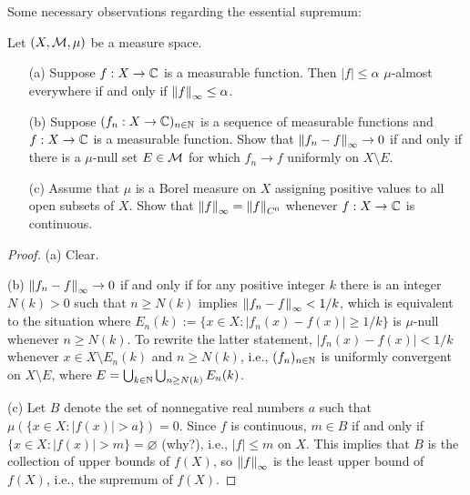 Some necessary observations regarding the essential supremum:
\begin{obs}
    Let $(X, {\mathcal{M}}, \mu)$ be a measure space.
    \begin{enumerate}
        \item[(a)]
        {
            Suppose $f: X\rightarrow{\mathbb{C}}$ is a measurable function.
            Then $|f|\leq\alpha$ $\mu$-almost everywhere if and only if ${\left\lVert{f}\right\rVert}_\infty\leq\alpha$.            
        }
        \item[(b)]
        {
            Suppose $(f_n: X\rightarrow{\mathbb{C}})_{n\in{\mathbb{N}}}$ is a sequence of measurable functions and $f: X\rightarrow{\mathbb{C}}$ is a measurable function.
            Show that ${\left\lVert{f_n-f}\right\rVert}_\infty\rightarrow 0$ if and only if there is a $\mu$-null set $E\in{\mathcal{M}}$ for which $f_n\rightarrow f$ uniformly on $X\setminus E$.
        }
        \item[(c)]
        {
            Assume that $\mu$ is a Borel measure on $X$ assigning positive values to all open subsets of $X$.
            Show that ${\left\lVert{f}\right\rVert}_\infty={\left\lVert{f}\right\rVert}_{C^0}$ whenever $f: X\rightarrow{\mathbb{C}}$ is continuous.
        }
    \end{enumerate}
\end{obs}
\begin{proof}
    \hangindent=0.65cm
    \noindent(a)
    Clear.

    \noindent(b)
    ${\left\lVert{f_n-f}\right\rVert}_\infty\rightarrow 0$ if and only if for any positive integer $k$ there is an integer $N(k)>0$ such that $n\geq N(k)$ implies ${\left\lVert{f_n-f}\right\rVert}_\infty<1/k$, which is equivalent to the situation where $E_n(k):=\{x\in X: |f_n(x)-f(x)|\geq 1/k\}$ is $\mu$-null whenever $n\geq N(k)$.
    To rewrite the latter statement, $|f_n(x)-f(x)|<1/k$ whenever $x\in X\setminus E_n(k)$ and $n\geq N(k)$, i.e., $(f_n)_{n\in{\mathbb{N}}}$ is uniformly convergent on $X\setminus E$, where $E=\bigcup_{k\in{\mathbb{N}}}\bigcup_{n\geq N(k)} E_n(k)$.

    \noindent(c)
    Let $B$ denote the set of nonnegative real numbers $a$ such that $\mu(\{x\in X: |f(x)|>a\})=0$.
    Since $f$ is continuous, $m\in B$ if and only if $\{x\in X: |f(x)|>m\}=\varnothing$ \color{brown}(why?)\color{black}, i.e., $|f|\leq m$ on $X$.
    This implies that $B$ is the collection of upper bounds of $f(X)$, so ${\left\lVert{f}\right\rVert}_\infty$ is the least upper bound of $f(X)$, i.e., the supremum of $f(X)$.
\end{proof}

